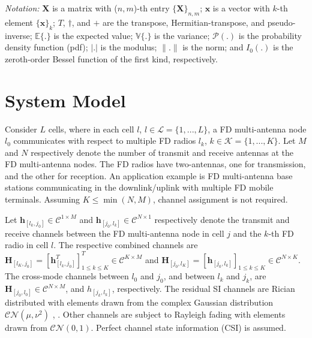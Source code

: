 \documentclass[onecolumn]{IEEEtran}
\begin{document}
\textit{Notation:} $\boldsymbol{X}$ is a matrix with ($n,m$)-th entry $\{ \boldsymbol{X} \}_{n,m}$; $\boldsymbol{x}$ is a vector with $k$-th element $\{ \boldsymbol{x} \}_{k}$; $T$, $\dag$, and $+$ are the transpose, Hermitian-transpose, and pseudo-inverse; $\mathbb{E}\{.\}$ is the expected value; $\mathbb{V} \{ . \}$ is the variance; $\mathcal{P}(.)$ is the probability density function (pdf); $| . |$ is the modulus; $\| . \|$ is the norm; and $I_{0}(.)$ is the zeroth-order Bessel function of the first kind, respectively.

\section{System Model}

Consider $L$ cells, where in each cell $l$, $l \in \mathcal{L} = \{1,...,L\}$, a FD multi-antenna node $l_{0}$ communicates with respect to multiple FD radios $l_{k}$, $k \in \mathcal{K} = \{ 1,...,K \}$. Let $M$ and $N$ respectively denote the number of transmit and receive antennas at the FD multi-antenna nodes. The FD radios have two-antennas, one for transmission, and the other for reception. An application example is FD multi-antenna base stations communicating in the downlink/uplink with multiple FD mobile terminals. Assuming $K \leq \min(N, M)$, channel assignment is not required.     

Let $\boldsymbol{h}_{[l_{k},j_{0}]} \in \mathcal{C}^{1 \times M}$ and $\boldsymbol{h}_{[j_{0},l_{k}]} \in \mathcal{C}^{N \times 1}$ respectively denote the transmit and receive channels between the FD multi-antenna node in cell $j$ and the $k$-th FD radio in cell $l$. The respective combined channels are $\boldsymbol{H}_{[l_{K},j_{0}]} = [\boldsymbol{h}^{T}_{[l_{k},j_{0}]} ]^{T}_{1 \leq k \leq K} \in \mathcal{C}^{K \times M}$ and $\boldsymbol{H}_{[j_{0},l_{K}]} = [\boldsymbol{h}_{[j_{0},l_{k}]}]_{1 \leq k \leq K} \in \mathcal{C}^{N \times K}$. The cross-mode channels between $l_{0}$ and $j_{0}$, and between $l_{k}$ and $j_{k}$, are $\boldsymbol{H}_{[j_{0},l_{0}]} \in \mathcal{C}^{N \times M}$, and $h_{[j_{k},l_{k}]}$, respectively. The residual SI channels are Rician distributed with elements drawn from the complex Gaussian distribution $\mathcal{C} \mathcal{N} ( \mu , \nu^2 )$ \cite{6847175}, \cite{atzeni2015full}. Other channels are subject to Rayleigh fading with elements drawn from $\mathcal{C} \mathcal{N} \left( 0 , 1 \right)$. Perfect channel state information (CSI) is assumed.
\end{document}
